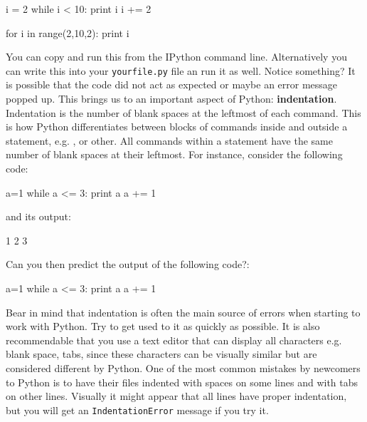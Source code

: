 \begin{python}
i = 2
while i < 10:
  print i  
  i += 2 
\end{python}

\begin{python}
for i in range(2,10,2):
    print i
\end{python}

You can copy and run this from the IPython command line. Alternatively you can write this into your \texttt{yourfile.py} file an run it as well. Notice something? It is possible that the code did not act as expected or maybe an error message popped up. This brings us to an important aspect of Python: \textbf{indentation}. Indentation is the number of blank spaces at the leftmost of each command. This is how Python differentiates between blocks of commands inside and outside a statement, e.g. ,  or other. All commands within a statement have the same number of blank spaces at their leftmost. For instance, consider the following code: 

\begin{python}
a=1
while a <= 3:
    print a
    a += 1
\end{python}

\noindent and its output:

\begin{python}
1
2
3
\end{python}


\begin{exercise}
Can you then predict the output of the following code?:

\begin{python}
a=1
while a <= 3:
    print a
a += 1
\end{python}

\end{exercise}

\noindent Bear in mind that indentation is often the main source of errors when starting to work with Python. Try to get used to it as quickly as possible. It is also recommendable that you use a text editor that can display all characters e.g. blank space, tabs, since these characters can be visually similar but are considered different by Python. One of the most common mistakes by newcomers to Python is to have their files indented with spaces on some lines and with tabs on other lines. Visually it might appear that all lines have proper indentation, but you will get an \texttt{IndentationError} message if you try it.


